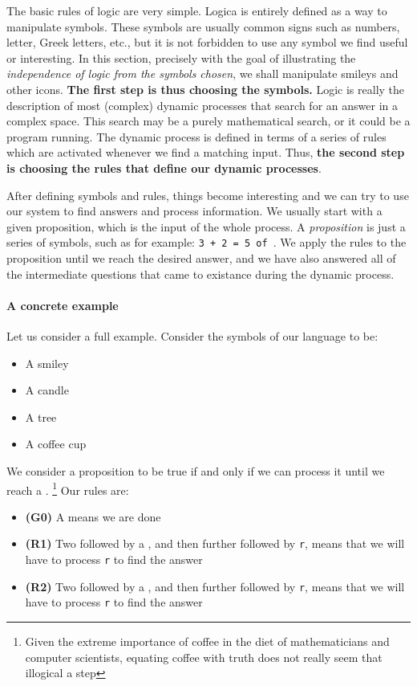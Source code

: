 The basic rules of logic are very simple. Logica is entirely defined as a way to manipulate symbols. These symbols are usually common signs such as numbers, letter, Greek letters, etc., but it is not forbidden to use any symbol we find useful or interesting. In this section, precisely with the goal of illustrating the \textit{independence of logic from the symbols chosen}, we shall manipulate smileys and other icons. \textbf{The first step is thus choosing the symbols.} Logic is really the description of most (complex) dynamic processes that search for an answer in a complex space. This search may be a purely mathematical search, or it could be a program running. The dynamic process is defined in terms of a series of rules which are activated whenever we find a matching input. Thus, \textbf{the second step is choosing the rules that define our dynamic processes}.

After defining symbols and rules, things become interesting and we can try to use our system to find answers and process information. We usually start with a given proposition, which is the input of the whole process. A \textit{proposition} is just a series of symbols, such as for example: \texttt{3 + 2 = 5 of \dSmiley\dSmiley\Candle\Candle}. We apply the rules to the proposition until we reach the desired answer, and we have also answered all of the intermediate questions that came to existance during the dynamic process.

\paragraph{A concrete example}
Let us consider a full example. Consider the symbols of our language to be:
\begin{itemize}
\item A smiley \dSmiley
\item A candle \Candle
\item A tree \Springtree
\item A coffee cup \Coffeecup
\end{itemize}

We consider a proposition to be true if and only if we can process it until we reach a \Coffeecup. \footnote{Given the extreme importance of coffee in the diet of mathematicians and computer scientists, equating coffee with truth does not really seem that illogical a step} Our rules are:

\begin{itemize}
\item \textbf{(G0)} A \Coffeecup means we are done
\item \textbf{(R1)} Two \dSmiley followed by a \Springtree, and then further followed by \texttt{r}, means that we will have to process \texttt{r} to find the answer
\item \textbf{(R2)} Two \Candle followed by a \Springtree, and then further followed by \texttt{r}, means that we will have to process \texttt{r} to find the answer
\end{itemize}

